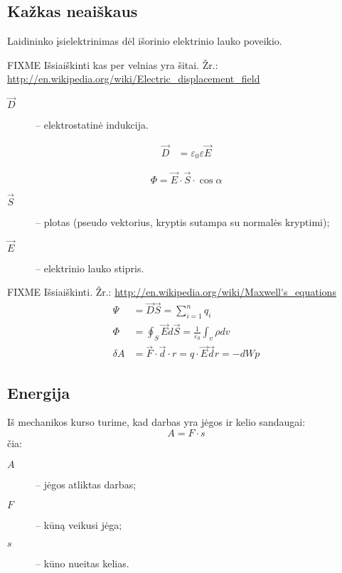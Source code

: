 \subsection{Kažkas neaiškaus}

\begin{defn}
  Laidininko įsielektrinimas dėl išorinio elektrinio lauko poveikio.
\end{defn}

FIXME Išsiaiškinti kas per velnias yra šitai.
Žr.: \url{http://en.wikipedia.org/wiki/Electric_displacement_field}

\begin{description}
  \item[$\vec{D}$] – elektrostatinė indukcija.
\end{description}
\begin{align*}
  \vec{D} &= \varepsilon_{0} \varepsilon \vec{E}
\end{align*}

\begin{defn}
  \begin{equation}
    \Phi = \vec{E} \cdot \vec{S} \cdot \cos \alpha
    \label{def:srautas}
  \end{equation}
  \begin{description}
    \item[$\vec{S}$] – plotas (pseudo vektorius, kryptis sutampa su
      normalės kryptimi);
    \item[$\vec{E}$] – elektrinio lauko stipris.
  \end{description}
\end{defn}

FIXME Išsiaiškinti.
Žr.: \url{http://en.wikipedia.org/wiki/Maxwell's_equations}
\begin{align*}
  \Psi &= \vec{D} \vec{S} = \sum _{i=1} ^{n} q_{i} \\
  \Phi &= \oint_{S} \vec{E} d \vec{S} = 
    \frac{1}{\varepsilon_{0}} \int _{v} \rho dv \\
  \delta A &= \vec{F} \cdot \vec{d} \cdot r =
    q \cdot \vec{E} \vec{d} r = -d W p
\end{align*}

\subsection{Energija}

Iš mechanikos kurso turime, kad darbas yra jėgos ir kelio sandaugai:
\begin{equation}
  A = F \cdot s
  \label{eq:mechanika:darbas}
\end{equation}
čia:
\begin{description}
  \item[$A$] – jėgos atliktas darbas;
  \item[$F$] – kūną veikusi jėga;
  \item[$s$] – kūno nueitas kelias.
\end{description}

